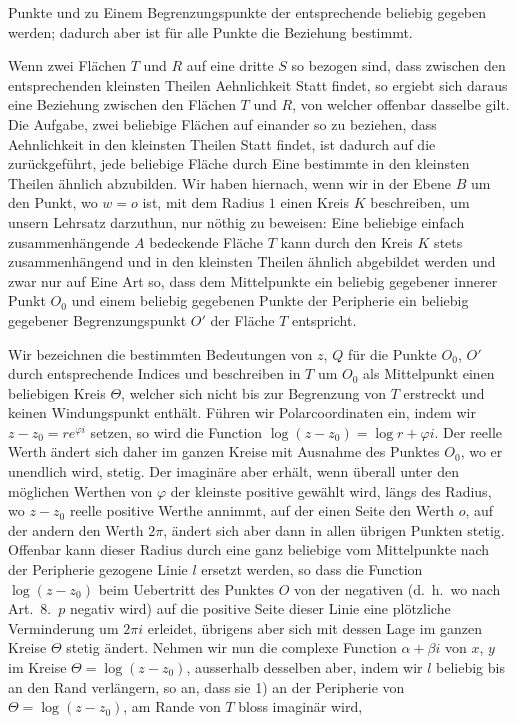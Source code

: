 \documentclass{article}
\begin{document}
Punkte und zu Einem Begrenzungspunkte der entsprechende beliebig gegeben werden; dadurch aber ist für alle Punkte die Beziehung bestimmt.

Wenn zwei Flächen $T$ und $R$ auf eine dritte $S$ so bezogen sind, dass zwischen den entsprechenden kleinsten Theilen Aehnlichkeit Statt findet, so ergiebt sich daraus eine Beziehung zwischen den Flächen $T$ und $R$, von welcher offenbar dasselbe gilt. Die Aufgabe, zwei beliebige Flächen auf einander so zu beziehen, dass Aehnlichkeit in den kleinsten Theilen Statt findet, ist dadurch auf die zurückgeführt, jede beliebige Fläche durch Eine bestimmte in den kleinsten Theilen ähnlich abzubilden. Wir haben hiernach, wenn wir in der Ebene $B$ um den Punkt, wo $w = o$ ist, mit dem Radius $1$ einen Kreis $K$ beschreiben, um unsern Lehrsatz darzuthun, nur nöthig zu beweisen: Eine beliebige einfach zusammenhängende $A$ bedeckende Fläche $T$ kann durch den Kreis $K$ stets zusammenhängend und in den kleinsten Theilen ähnlich abgebildet werden und zwar nur auf Eine Art so, dass dem Mittelpunkte ein beliebig gegebener innerer Punkt $O_0$ und einem beliebig gegebenen Punkte der Peripherie ein beliebig gegebener Begrenzungspunkt $O'$ der Fläche $T$ entspricht.

Wir bezeichnen die bestimmten Bedeutungen von $z$, $Q$ für die Punkte $O_0$, $O'$ durch entsprechende Indices und beschreiben in $T$ um $O_0$ als Mittelpunkt einen beliebigen Kreis $\varTheta$, welcher sich nicht bis zur Begrenzung von $T$ erstreckt und keinen Windungspunkt enthält. Führen wir Polarcoordinaten ein, indem wir $z - z_0 = r e^{\varphi i}$ setzen, so wird die Function $\log(z - z_0) = \log r + \varphi i$. Der reelle Werth ändert sich daher im ganzen Kreise mit Ausnahme des Punktes $O_0$, wo er unendlich wird, stetig. Der imaginäre aber erhält, wenn überall unter den möglichen Werthen von $\varphi$ der kleinste positive gewählt wird, längs des Radius, wo $z - z_0$ reelle positive Werthe annimmt, auf der einen Seite den Werth $o$, auf der andern den Werth $2\pi$, ändert sich aber dann in allen übrigen Punkten stetig. Offenbar kann dieser Radius durch eine ganz beliebige vom Mittelpunkte nach der Peripherie gezogene Linie $l$ ersetzt werden, so dass die Function $\log(z - z_0)$ beim Uebertritt des Punktes $O$ von der negativen (d.\ h.\ wo nach Art.~8.\ $p$ negativ wird) auf die positive Seite dieser Linie eine plötzliche Verminderung um $2\pi i$ erleidet, übrigens aber sich mit dessen Lage im ganzen Kreise $\varTheta$ stetig ändert. Nehmen wir nun die complexe Function $\alpha + \beta i$ von $x$, $y$ im Kreise $\varTheta = \log(z - z_0)$, ausserhalb desselben aber, indem wir $l$ beliebig bis an den Rand verlängern, so an, dass sie
1) an der Peripherie von $\varTheta = \log(z - z_0)$, am Rande von $T$ bloss imaginär wird,
\end{document}
